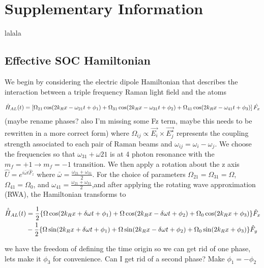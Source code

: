 \section{Supplementary Information}
lalala

\subsection{Effective SOC Hamiltonian}	

We begin by considering the electric dipole Hamiltonian that describes the interaction between a triple frequency Raman light field and the atoms

\begin{align}
	\hat{H}_{AL}(t) = \left[\Omega_{21}\cos(2{{k_R}} x-\omega_{21} t +\phi_1)+\Omega_{31}\cos(2{{k_R}} x-\omega_{31} t+\phi_2)+\Omega_{41}\cos(2{{k_R}} x-\omega_{41} t + \phi_3)\right]\hat{F_x}
\end{align}
%
(maybe rename phases? also I'm missing some Fz term, maybe this needs to be rewritten in a more correct form)
%
where $\Omega_{ij}\propto \vec{E_i}\times\vec{E_j^{\star}}$ represents the coupling strength associated to each pair of Raman beams and $\omega_{ij} = \omega_{i}-\omega_{j} $. We choose the frequencies so that $\omega_{31} + \omega{21}$ is at 4 photon resonance with the $m_f = +1\rightarrow m_f = -1$ transition. We then apply a rotation about the z axis $\hat{U} = e^{i\bar{\omega} t\hat{F}_z}$ where $\bar{\omega} = \frac{\omega_{21}+\omega_{31}}{2}$. For the choice of parameters 
$\Omega_{21} =\Omega_{31} = \Omega $, $\Omega_{41}=\Omega_0$, and $\omega_{41} =\frac{\omega_{21}+\omega_{31}}{2}$,and after applying the rotating wave approximation (RWA), the Hamiltonian transforms to  
%
%

	
\begin{align}
	\begin{split}
		\hat{\tilde{H}}_{AL}(t) &= \frac{1}{2}\lbrace\Omega\cos(2{{k_R}} x+\delta\omega t +\phi_1)+\Omega\cos(2{{k_R}} x-\delta\omega t + \phi_2) +\Omega_0\cos(2{{k_R}} x + \phi_3)\rbrace \hat{F}_x \\
		& -  \frac{1}{2}\lbrace\Omega\sin(2{{k_R}} x+\delta\omega t +\phi_1)+\Omega\sin(2{{k_R}} x-\delta\omega t +\phi_2)+\Omega_0\sin(2{{k_R}} x +\phi_3)\rbrace \hat{F}_y
	\end{split}
\end{align}

we have the freedom of defining the time origin so we can get rid of one phase, lets make it $\phi_3$ for convenience. Can I get rid of a second phase? Make $\phi_1 = -\phi_2$
 
